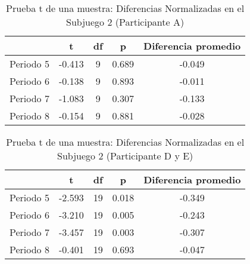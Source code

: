 \begin{table}[h]
\caption[Prueba t de una muestra: Diferencias Normalizadas en el Subjuego 2 (Participante A)]{Prueba t de una muestra: Diferencias Normalizadas en el Subjuego 2 (Participante A)}
\label{DN-S1}
\centering
\begin{tabular}{l | c c c | c}
\toprule
\textbf{} & \textbf{t} & \textbf{df} & \textbf{p} & \textbf{Diferencia promedio}\\
\midrule
Periodo 5 & -0.413 & 9 & 0.689 & -0.049\\
Periodo 6 & -0.138 & 9 & 0.893 & -0.011\\
Periodo 7 & -1.083 & 9 & 0.307 & -0.133\\
Periodo 8 & -0.154 & 9 & 0.881 & -0.028\\
\bottomrule
\end{tabular}
\end{table}













\begin{table}[h]
\caption[Prueba t de una muestra: Diferencias Normalizadas en el Subjuego 2 (Participantes D y E)]{Prueba t de una muestra: Diferencias Normalizadas en el Subjuego 2 (Participante D y E)}
\label{DN-S1}
\centering
\begin{tabular}{l | c c c | c}
\toprule
\textbf{} & \textbf{t} & \textbf{df} & \textbf{p} & \textbf{Diferencia promedio}\\
\midrule
Periodo 5 & -2.593 & 19 & 0.018 & -0.349\\
Periodo 6 & -3.210 & 19 & 0.005 & -0.243\\
Periodo 7 & -3.457 & 19 & 0.003 & -0.307\\
Periodo 8 & -0.401 & 19 & 0.693 & -0.047\\
\bottomrule
\end{tabular}
\end{table}












